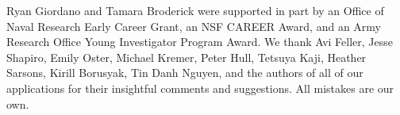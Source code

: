 Ryan Giordano and Tamara Broderick were supported in part by an
Office of Naval Research Early Career Grant, an NSF CAREER Award, and an
Army Research Office Young Investigator Program Award.  We thank Avi Feller, Jesse Shapiro, Emily
Oster, Michael Kremer, Peter Hull, Tetsuya Kaji, Heather Sarsons, Kirill
Borusyak, Tin Danh Nguyen, and the authors of all of our applications for
their insightful comments and suggestions. All mistakes are our own.